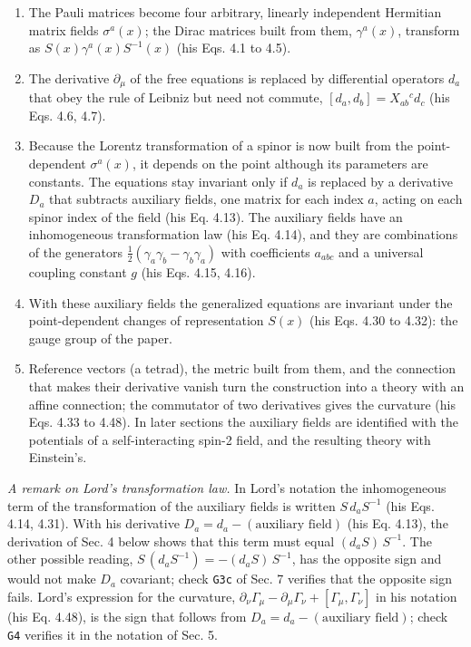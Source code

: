 \documentclass[
  10pt,
]{article}
\providecommand{\tightlist}{%
  \setlength{\itemsep}{0pt}\setlength{\parskip}{0pt}}
\begin{document}
\begin{enumerate}
\def\labelenumi{\arabic{enumi}.}
\tightlist
\item
  The Pauli matrices become four arbitrary, linearly independent
  Hermitian matrix fields \(\sigma^a(x)\); the Dirac matrices built from
  them, \(\gamma^a(x)\), transform as \(S(x)\gamma^a(x)S^{-1}(x)\) (his
  Eqs. 4.1 to 4.5).
\item
  The derivative \(\partial_\mu\) of the free equations is replaced by
  differential operators \(d_a\) that obey the rule of Leibniz but need
  not commute, \([d_a,d_b]=X_{ab}{}^c d_c\) (his Eqs. 4.6, 4.7).
\item
  Because the Lorentz transformation of a spinor is now built from the
  point-dependent \(\sigma^a(x)\), it depends on the point although its
  parameters are constants. The equations stay invariant only if \(d_a\)
  is replaced by a derivative \(D_a\) that subtracts auxiliary fields,
  one matrix for each index \(a\), acting on each spinor index of the
  field (his Eq. 4.13). The auxiliary fields have an inhomogeneous
  transformation law (his Eq. 4.14), and they are combinations of the
  generators \(\tfrac12(\gamma_a\gamma_b-\gamma_b\gamma_a)\) with
  coefficients \(a_{abc}\) and a universal coupling constant \(g\) (his
  Eqs. 4.15, 4.16).
\item
  With these auxiliary fields the generalized equations are invariant
  under the point-dependent changes of representation \(S(x)\) (his Eqs.
  4.30 to 4.32): the gauge group of the paper.
\item
  Reference vectors (a tetrad), the metric built from them, and the
  connection that makes their derivative vanish turn the construction
  into a theory with an affine connection; the commutator of two
  derivatives gives the curvature (his Eqs. 4.33 to 4.48). In later
  sections the auxiliary fields are identified with the potentials of a
  self-interacting spin-2 field, and the resulting theory with
  Einstein's.
\end{enumerate}

\emph{A remark on Lord's transformation law.} In Lord's notation the
inhomogeneous term of the transformation of the auxiliary fields is
written \(S\,d_aS^{-1}\) (his Eqs. 4.14, 4.31). With his derivative
\(D_a=d_a-(\text{auxiliary field})\) (his Eq. 4.13), the derivation of
Sec. 4 below shows that this term must equal \((d_aS)\,S^{-1}\). The
other possible reading, \(S\,(d_aS^{-1})=-(d_aS)\,S^{-1}\), has the
opposite sign and would not make \(D_a\) covariant; check \texttt{G3c}
of Sec. 7 verifies that the opposite sign fails. Lord's expression for
the curvature,
\(\partial_\nu\Gamma_\mu-\partial_\mu\Gamma_\nu+[\Gamma_\mu,\Gamma_\nu]\)
in his notation (his Eq. 4.48), is the sign that follows from
\(D_a=d_a-(\text{auxiliary field})\); check \texttt{G4} verifies it in
the notation of Sec. 5.
\end{document}
